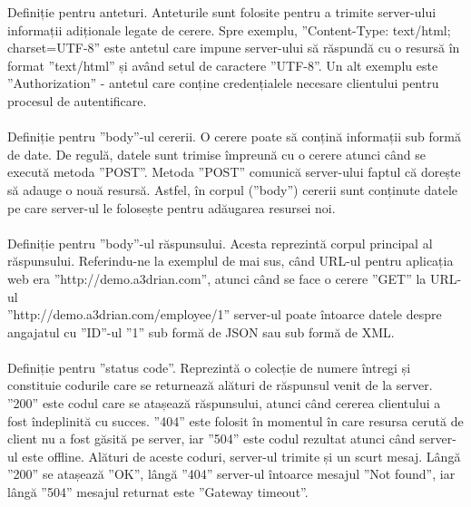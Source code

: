 Definiție pentru anteturi. Anteturile sunt folosite pentru a trimite server-ului informații adiționale legate de cerere. Spre exemplu, ”Content-Type: text/html; charset=UTF-8” este antetul care impune server-ului să răspundă cu o resursă în format ”text/html” și având setul de caractere ”UTF-8”. Un alt exemplu este ”Authorization” - antetul care conține credențialele necesare clientului pentru procesul de autentificare.
\\ \\
Definiție pentru ”body”-ul cererii. O cerere poate să conțină informații sub formă de date. De regulă, datele sunt trimise împreună cu o cerere atunci când se execută metoda ”POST”. Metoda ”POST” comunică server-ului faptul că dorește să adauge o nouă resursă. Astfel, în corpul (”body”) cererii sunt conținute datele pe care server-ul le folosește pentru adăugarea resursei noi.
\\ \\
Definiție pentru ”body”-ul răspunsului. Acesta reprezintă corpul principal al răspunsului. Referindu-ne la exemplul de mai sus, când URL-ul pentru aplicația web era ”http://demo.a3drian.com”, atunci când se face o cerere ”GET” la URL-ul\\”http://demo.a3drian.com/employee/1” server-ul poate întoarce datele despre angajatul cu ”ID”-ul ”1” sub formă de JSON sau sub formă de XML.
\\ \\
Definiție pentru ”status code”. Reprezintă o colecție de numere întregi și constituie codurile care se returnează alături de răspunsul venit de la server. ”200” este codul care se atașează răspunsului, atunci când cererea clientului a fost îndeplinită cu succes. ”404” este folosit în momentul în care resursa cerută de client nu a fost găsită pe server, iar ”504” este codul rezultat atunci când server-ul este offline. Alături de aceste coduri, server-ul trimite și un scurt mesaj. Lângă ”200” se atașează ”OK”, lângă ”404” server-ul întoarce mesajul ”Not found”, iar lângă ”504” mesajul returnat este ”Gateway timeout”.